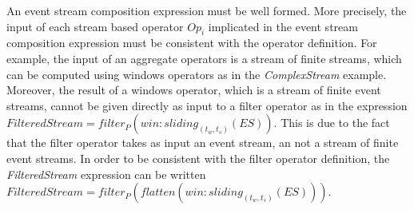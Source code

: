   
  An event stream composition expression must be well formed. More precisely, the input of each stream based operator $Op_i$ implicated in the event stream composition expression must be consistent with the operator definition. For example, the input of an aggregate operators is a stream of finite streams, which can be computed using windows operators as in the \textit{ComplexStream} example. Moreover, the result of a windows operator, which is a stream of finite event streams, cannot be given directly as input to a filter operator as in the expression $FilteredStream=filter_P(win:sliding_{(t_w,t_s)}(ES))$. 
  This is due to the fact that the filter operator takes as input an event stream, an not a stream of finite event streams. In order to be consistent with the filter operator definition, the \textit{FilteredStream} expression can be written $FilteredStream=filter_P(flatten(win:sliding_{(t_w,t_s)}(ES)))$.    
